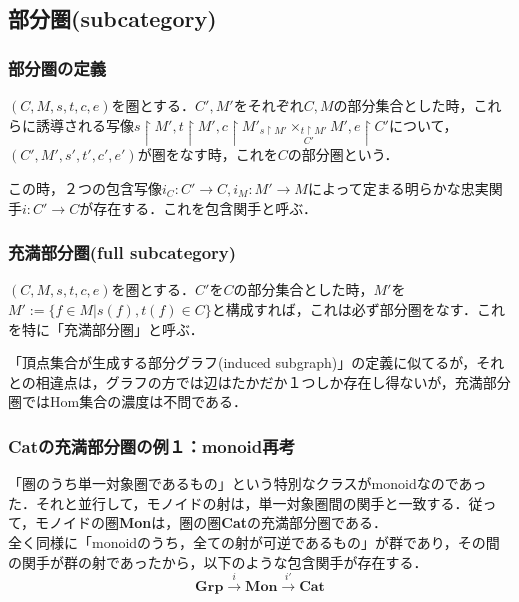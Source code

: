 \documentclass[uplatex, 12pt, a4paper, dvipdfmx]{jsarticle}
\begin{document}
\subsection{部分圏(subcategory)}

\subsubsection{部分圏の定義}
\begin{shadebox}\begin{definition}[部分圏]
    $(C,M,s,t,c,e)$を圏とする．$C',M'$をそれぞれ$C,M$の部分集合とした時，これらに誘導される写像$s\upharpoonright M', t\upharpoonright M', c\upharpoonright M'_{s\upharpoonright M'}\underset{C'}{\times_{t\upharpoonright M'}}M', e\upharpoonright C'$について，$(C',M',s', t', c', e')$が圏をなす時，これを$C$の部分圏という．
\end{definition}\end{shadebox}
この時，２つの包含写像$i_C:C'\longrightarrow C, i_M:M'\longrightarrow M$によって定まる明らかな忠実関手$i:C'\longrightarrow C$が存在する．これを包含関手と呼ぶ．

\subsubsection{充満部分圏(full subcategory)}
\begin{shadebox}\begin{definition}[充満部分圏]
    $(C,M,s,t,c,e)$を圏とする．$C'$を$C$の部分集合とした時，$M'$を$M':=\{ f\in M | s(f), t(f)\in C \}$と構成すれば，これは必ず部分圏をなす．これを特に「充満部分圏」と呼ぶ．
\end{definition}\end{shadebox}
「頂点集合が生成する部分グラフ(induced subgraph)」の定義に似てるが，それとの相違点は，グラフの方では辺はたかだか１つしか存在し得ないが，充満部分圏ではHom集合の濃度は不問である．

\subsubsection{\textbf{Cat}の充満部分圏の例１：monoid再考}
「圏のうち単一対象圏であるもの」という特別なクラスがmonoidなのであった．それと並行して，モノイドの射は，単一対象圏間の関手と一致する．従って，モノイドの圏\textbf{Mon}は，圏の圏\textbf{Cat}の充満部分圏である．\\
全く同様に「monoidのうち，全ての射が可逆であるもの」が群であり，その間の関手が群の射であったから，以下のような包含関手が存在する．
$$\mathbf{Grp}\xrightarrow{i}\mathbf{Mon}\xrightarrow{i'}\mathbf{Cat}$$
\end{document}
